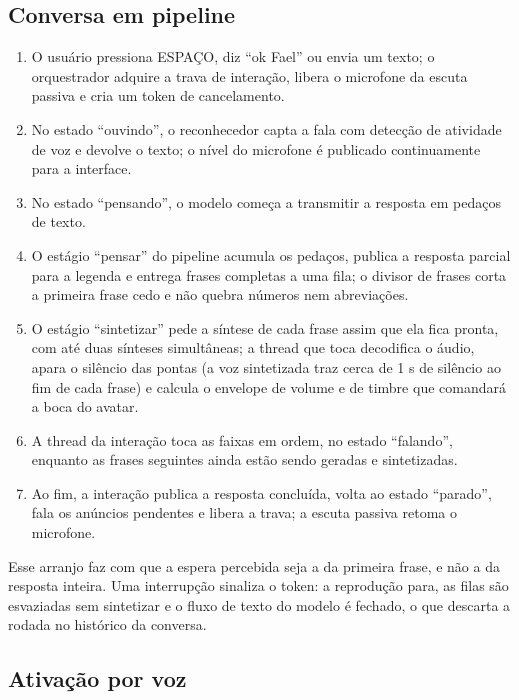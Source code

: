 \subsection{Conversa em pipeline}

\begin{enumerate}[label=\arabic*.]
  \item O usuário pressiona ESPAÇO, diz “ok Fael” ou envia um texto; o orquestrador adquire a trava de
        interação, libera o microfone da escuta passiva e cria um token de cancelamento.
  \item No estado “ouvindo”, o reconhecedor capta a fala com detecção de atividade de voz e devolve o
        texto; o nível do microfone é publicado continuamente para a interface.
  \item No estado “pensando”, o modelo começa a transmitir a resposta em pedaços de texto.
  \item O estágio “pensar” do pipeline acumula os pedaços, publica a resposta parcial para a legenda e
        entrega frases completas a uma fila; o divisor de frases corta a primeira frase cedo e não quebra
        números nem abreviações.
  \item O estágio “sintetizar” pede a síntese de cada frase assim que ela fica pronta, com até duas
        sínteses simultâneas; a thread que toca decodifica o áudio, apara o silêncio das pontas (a voz
        sintetizada traz cerca de 1 s de silêncio ao fim de cada frase) e calcula o envelope de volume e
        de timbre que comandará a boca do avatar.
  \item A thread da interação toca as faixas em ordem, no estado “falando”, enquanto as frases seguintes
        ainda estão sendo geradas e sintetizadas.
  \item Ao fim, a interação publica a resposta concluída, volta ao estado “parado”, fala os anúncios
        pendentes e libera a trava; a escuta passiva retoma o microfone.
\end{enumerate}

Esse arranjo faz com que a espera percebida seja a da primeira frase, e não a da resposta inteira. Uma
interrupção sinaliza o token: a reprodução para, as filas são esvaziadas sem sintetizar e o fluxo de
texto do modelo é fechado, o que descarta a rodada no histórico da conversa.

\subsection{Ativação por voz}

